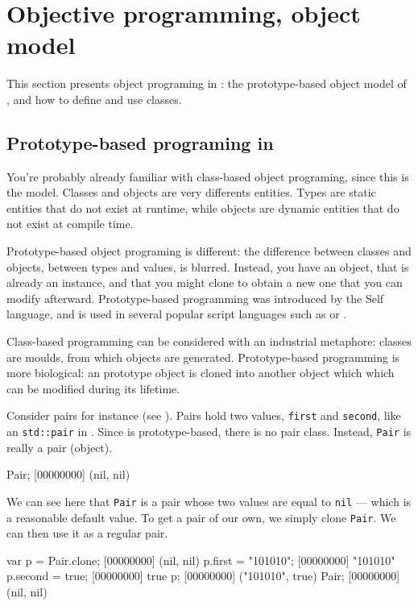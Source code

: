 \chapter{Objective programming, \us object model}
\label{sec:tut:object}

This section presents object programing in \us: the prototype-based
object model of \us, and how to define and use classes.

\section{Prototype-based programing in \us}

You're probably already familiar with class-based object programing,
since this is the \Cxx model.  Classes and objects are very differents
entities.  Types are static entities that do not exist at runtime,
while objects are dynamic entities that do not exist at compile time.

Prototype-based object programing is different: the difference between
classes and objects, between types and values, is blurred. Instead,
you have an
object, that is already an instance, and that you might clone to
obtain a new one that you can modify afterward. Prototype-based
programming was introduced by the Self language, and is used in
several popular script languages such as \io or \js.

Class-based programming can be considered with an industrial
metaphore: classes are moulds, from which objects are generated.
Prototype-based programming is more biological: an prototype object is
cloned into another object which which can be modified during its
lifetime.

Consider pairs for instance (see ). Pairs hold two
values, \lstinline|first| and \lstinline|second|, like an
\lstinline{std::pair} in \Cxx. Since \us is prototype-based, there is
no pair class. Instead, \lstinline|Pair| is really a pair (object).

\begin{urbiscript}
Pair;
[00000000] (nil, nil)
\end{urbiscript}

We can see here that \lstinline|Pair| is a pair whose two values are
equal to \lstinline|nil| --- which is a reasonable default value. To
get a pair of our own, we simply clone \lstinline|Pair|.  We can then
use it as a regular pair.

\begin{urbiscript}
var p = Pair.clone;
[00000000] (nil, nil)
p.first = "101010";
[00000000] "101010"
p.second = true;
[00000000] true
p;
[00000000] ("101010", true)
Pair;
[00000000] (nil, nil)
\end{urbiscript}

